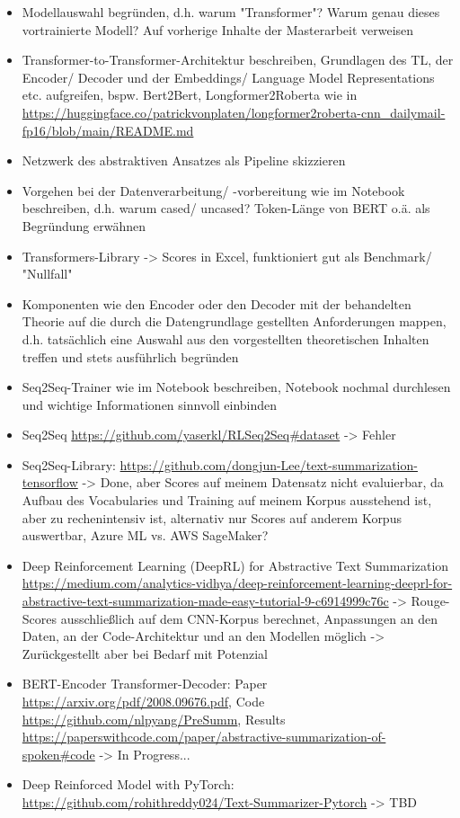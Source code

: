 \begin{itemize}
	\item Modellauswahl begründen, d.h. warum "Transformer"? Warum genau dieses vortrainierte Modell? Auf vorherige Inhalte der Masterarbeit verweisen
	\item Transformer-to-Transformer-Architektur beschreiben, Grundlagen des TL, der Encoder/ Decoder und der Embeddings/ Language Model Representations etc. aufgreifen, bspw. Bert2Bert, Longformer2Roberta wie in \url{https://huggingface.co/patrickvonplaten/longformer2roberta-cnn_dailymail-fp16/blob/main/README.md}
	\item Netzwerk des abstraktiven Ansatzes als Pipeline skizzieren
	\item Vorgehen bei der Datenverarbeitung/ -vorbereitung wie im Notebook beschreiben, d.h. warum cased/ uncased? Token-Länge von BERT o.ä. als Begründung erwähnen
	\item Transformers-Library -> Scores in Excel, funktioniert gut als Benchmark/ "Nullfall"
	\item Komponenten wie den Encoder oder den Decoder mit der behandelten Theorie auf die durch die Datengrundlage gestellten Anforderungen mappen, d.h. tatsächlich eine Auswahl aus den vorgestellten theoretischen Inhalten treffen und stets ausführlich begründen
	\item Seq2Seq-Trainer wie im Notebook beschreiben, Notebook nochmal durchlesen und wichtige Informationen sinnvoll einbinden
	\item Seq2Seq \url{https://github.com/yaserkl/RLSeq2Seq#dataset} -> Fehler
	\item Seq2Seq-Library: \url{https://github.com/dongjun-Lee/text-summarization-tensorflow} -> Done, aber Scores auf meinem Datensatz nicht evaluierbar, da Aufbau des Vocabularies und Training auf meinem Korpus ausstehend ist, aber zu rechenintensiv ist, alternativ nur Scores auf anderem Korpus auswertbar, Azure ML vs. AWS SageMaker?
	\item Deep Reinforcement Learning (DeepRL) for Abstractive Text Summarization \url{https://medium.com/analytics-vidhya/deep-reinforcement-learning-deeprl-for-abstractive-text-summarization-made-easy-tutorial-9-c6914999c76c} -> Rouge-Scores ausschließlich auf dem CNN-Korpus berechnet, Anpassungen an den Daten, an der Code-Architektur und an den Modellen möglich -> Zurückgestellt aber bei Bedarf mit Potenzial
	\item BERT-Encoder Transformer-Decoder: Paper \url{https://arxiv.org/pdf/2008.09676.pdf}, Code \url{https://github.com/nlpyang/PreSumm}, Results \url{https://paperswithcode.com/paper/abstractive-summarization-of-spoken#code} -> In Progress...
	\item Deep Reinforced Model with PyTorch: \url{https://github.com/rohithreddy024/Text-Summarizer-Pytorch} -> TBD
\end{itemize}


